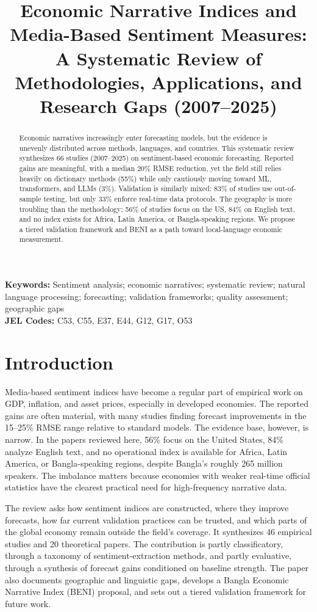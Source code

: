 \documentclass[12pt,oneside]{article}
\title{\textbf{Economic Narrative Indices and Media-Based Sentiment Measures:\\
A Systematic Review of Methodologies, Applications, and Research Gaps (2007--2025)}}
\author{} %
\date{}
\begin{document}
\maketitle

\begin{abstract}
Economic narratives increasingly enter forecasting models, but the evidence is unevenly distributed across methods, languages, and countries. This systematic review synthesizes 66 studies (2007--2025) on sentiment-based economic forecasting. Reported gains are meaningful, with a median 20\% RMSE reduction, yet the field still relies heavily on dictionary methods (55\%) while only cautiously moving toward ML, transformers, and LLMs (3\%). Validation is similarly mixed: 83\% of studies use out-of-sample testing, but only 33\% enforce real-time data protocols. The geography is more troubling than the methodology: 56\% of studies focus on the US, 84\% on English text, and no index exists for Africa, Latin America, or Bangla-speaking regions. We propose a tiered validation framework and BENI as a path toward local-language economic measurement.
\end{abstract}

\noindent \textbf{Keywords:} Sentiment analysis; economic narratives; systematic review; natural language processing; forecasting; validation frameworks; quality assessment; geographic gaps \\
\textbf{JEL Codes:} C53, C55, E37, E44, G12, G17, O53

\section{Introduction}

Media-based sentiment indices have become a regular part of empirical work on GDP, inflation, and asset prices, especially in developed economies. The reported gains are often material, with many studies finding forecast improvements in the 15--25\% RMSE range relative to standard models. The evidence base, however, is narrow. In the papers reviewed here, 56\% focus on the United States, 84\% analyze English text, and no operational index is available for Africa, Latin America, or Bangla-speaking regions, despite Bangla's roughly 265 million speakers. The imbalance matters because economies with weaker real-time official statistics have the clearest practical need for high-frequency narrative data.

The review asks how sentiment indices are constructed, where they improve forecasts, how far current validation practices can be trusted, and which parts of the global economy remain outside the field's coverage. It synthesizes 46 empirical studies and 20 theoretical papers. The contribution is partly classificatory, through a taxonomy of sentiment-extraction methods, and partly evaluative, through a synthesis of forecast gains conditioned on baseline strength. The paper also documents geographic and linguistic gaps, develops a Bangla Economic Narrative Index (BENI) proposal, and sets out a tiered validation framework for future work.
\end{document}
